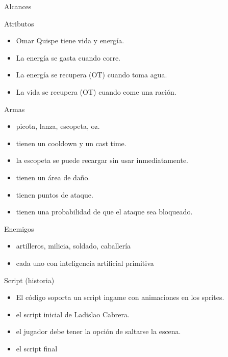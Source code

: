 \begin{section}{Alcances}
  \begin{subsection}{Atributos}
    \begin{itemize}
    \item Omar Quispe tiene vida y energía.
    \item La energía se gasta cuando corre.
    \item La energía se recupera (OT) cuando toma agua.
    \item La vida se recupera (OT) cuando come una ración.
    \end{itemize}
  \end{subsection}

  \begin{subsection}{Armas}
    \begin{itemize}
    \item picota, lanza, escopeta, oz.
    \item tienen un cooldown y un cast time.
    \item la escopeta se puede recargar sin usar inmediatamente.
    \item tienen un área de daño.
    \item tienen puntos de ataque.
    \item tienen una probabilidad de que el ataque sea bloqueado.
    \end{itemize}
  \end{subsection}

  \begin{subsection}{Enemigos}
    \begin{itemize}
    \item artilleros, milicia, soldado, caballería
    \item cada uno con inteligencia artificial primitiva
    \end{itemize}
  \end{subsection}

  \begin{subsection}{Script (historia)}
    \begin{itemize}
    \item El código soporta un script ingame con animaciones en los sprites.
    \item el script inicial de Ladislao Cabrera.
    \item el jugador debe tener la opción de saltarse la escena.
    \item el script final
    \end{itemize}
  \end{subsection}
\end{section}
